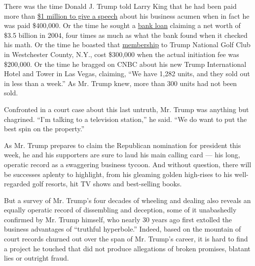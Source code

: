 There was the time Donald J. Trump told Larry King that he had been paid
more than \href{http://www.cnn.com/TRANSCRIPTS/0603/09/lkl.01.html}{\$1
million to give a speech} about his business acumen when in fact he was
paid \$400,000. Or the time he sought a
\href{http://www.nytimes3xbfgragh.onion/2016/05/24/business/dealbook/donald-trump-relationship-bankers.html}{bank
loan} claiming a net worth of \$3.5 billion in 2004, four times as much
as what the bank found when it checked his math. Or the time he boasted
that
\href{https://books.google.com/books?id=Fo_l25-54sQC\&pg=PA46\&lpg=PA46\&dq=Trump+101:+How+to+Get+Rich+Membership+costs+$300,000.+I+think+it\%E2\%80\%99s+a+bargain\&source=bl\&ots=MgDzJ-CmYk\&sig=pwudPB88zsdU4fhWo-8-V3_-AC8\&hl=en\&sa=X\&ved=0ahUKEwiHip7V1PPNAhWDQCYKHYCDBvYQ6AEIHjAA\#v=onepage\&q=Trump\%20101\%3A\%20How\%20to\%20Get\%20Rich\%20Membership\%20costs\%20\%24300\%2C000.\%20I\%20think\%20it\%E2\%80\%99s\%20a\%20bargain\&f=false}{membership}
to Trump National Golf Club in Westchester County, N.Y., cost \$300,000
when the actual initiation fee was \$200,000. Or the time he bragged on
CNBC about his new Trump International Hotel and Tower in Las Vegas,
claiming, ``We have 1,282 units, and they sold out in less than a
week.'' As Mr. Trump knew, more than 300 units had not been sold.

Confronted in a court case about this last untruth, Mr. Trump was
anything but chagrined. ``I'm talking to a television station,'' he
said. ``We do want to put the best spin on the property.''

As Mr. Trump prepares to claim the Republican nomination for president
this week, he and his supporters are sure to laud his main calling card
--- his long, operatic record as a swaggering business tycoon. And
without question, there will be successes aplenty to highlight, from his
gleaming golden high-rises to his well-regarded golf resorts, hit TV
shows and best-selling books.

But a survey of Mr. Trump's four decades of wheeling and dealing also
reveals an equally operatic record of dissembling and deception, some of
it unabashedly confirmed by Mr. Trump himself, who nearly 30 years ago
first extolled the business advantages of ``truthful hyperbole.''
Indeed, based on the mountain of court records churned out over the span
of Mr. Trump's career, it is hard to find a project he touched that did
not produce allegations of broken promises, blatant lies or outright
fraud.

